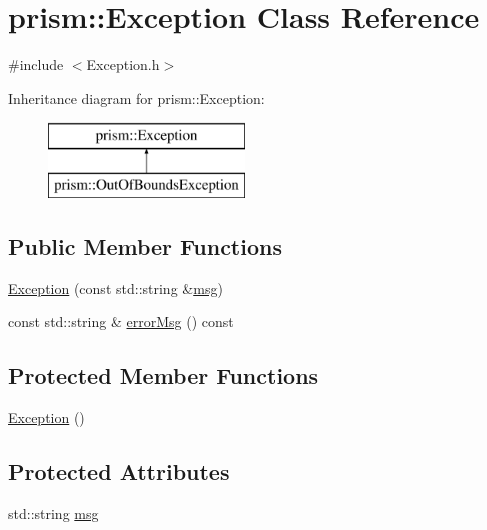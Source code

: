 \hypertarget{classprism_1_1_exception}{}\section{prism\+:\+:Exception Class Reference}
\label{classprism_1_1_exception}


{\ttfamily \#include $<$Exception.\+h$>$}

Inheritance diagram for prism\+:\+:Exception\+:\begin{figure}[H]
\begin{center}
\leavevmode
\includegraphics[height=2.000000cm]{classprism_1_1_exception}
\end{center}
\end{figure}
\subsection*{Public Member Functions}
\begin{DoxyCompactItemize}
\item 
\hyperlink{classprism_1_1_exception_ae878686fee2f57a9461a306a6a1e0fe7}{Exception} (const std\+::string \&\hyperlink{classprism_1_1_exception_ab768e96bc8a3f617b3420e19a18caf9f}{msg})
\item 
const std\+::string \& \hyperlink{classprism_1_1_exception_aba1bf849ad38dd259361be85672fc309}{error\+Msg} () const 
\end{DoxyCompactItemize}
\subsection*{Protected Member Functions}
\begin{DoxyCompactItemize}
\item 
\hyperlink{classprism_1_1_exception_aa99b00004a3c6643adbcf7c7575fd0ce}{Exception} ()
\end{DoxyCompactItemize}
\subsection*{Protected Attributes}
\begin{DoxyCompactItemize}
\item 
std\+::string \hyperlink{classprism_1_1_exception_ab768e96bc8a3f617b3420e19a18caf9f}{msg}
\end{DoxyCompactItemize}


